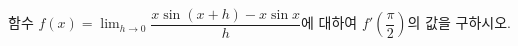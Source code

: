 함수 $f(x)=\displaystyle\lim_{h\to 0}\dfrac{x\sin(x+h)-x\sin x}{h}$에 대하여 $f'\!\left(\dfrac{\pi}{2}\right)$의 값을 구하시오.
